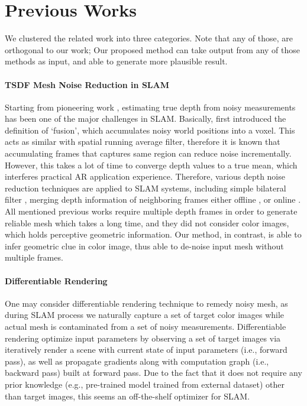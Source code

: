 \section{Previous Works}

We clustered the related work into three categories. Note that any of those, are orthogonal to our work; Our proposed method can take output from any of those methods as input, and able to generate more plausible result.

\paragraph{TSDF Mesh Noise Reduction in SLAM}
Starting from pioneering work \cite{curless1996volumetric}, estimating true depth from noisy measurements has been one of the major challenges in SLAM. 
Basically, \cite{curless1996volumetric} first introduced the definition of ‘fusion’, which accumulates noisy world positions into a voxel. 
This acts as similar with spatial running average filter, therefore it is known that accumulating frames that captures same region can reduce noise incrementally. 
However, this takes a lot of time to converge depth values to a true mean, which interferes practical AR application experience. 
Therefore, various depth noise reduction techniques are applied to SLAM systems, including simple bilateral filter \cite{newcombe2011kinectfusion},  merging depth information of neighboring frames either offline \cite{choi2015robust}\cite{zhou2018open3d}, or online \cite{cao2018real}\cite{yang2020noise}. 
All mentioned previous works require multiple depth frames in order to generate reliable mesh which takes a long time, and they did not consider color images, which holds perceptive geometric information. 
Our method, in contrast, is able to infer geometric clue in color image, thus able to de-noise input mesh without multiple frames.

\paragraph{Differentiable Rendering}
One may consider differentiable rendering technique to remedy noisy mesh, as during SLAM process we naturally capture a set of target color images while actual mesh is contaminated from a set of noisy measurements.
Differentiable rendering optimize input parameters by observing a set of target images via iteratively render a scene with current state of input parameters (i.e., forward pass), as well as propagate gradients along with computation graph (i.e., backward pass) built at forward pass. 
Due to the fact that it does not require any prior knowledge (e.g., pre-trained model trained from external dataset) other than target images, this seems an off-the-shelf optimizer for SLAM. 

